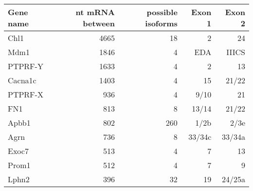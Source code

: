 \small
\begin{tabular}{|l|r|r|r|r|}

  \hline
  \textbf{Gene name} & \textbf{nt mRNA between} & \textbf{possible isoforms} & \textbf{Exon 1} & \textbf{Exon 2} \\ \hline
  Chl1               & 4665                              & 18                         & 2               & 24              \\ \hline
  Mdm1               & 1846                              & 4                          & EDA             & IIICS           \\ \hline
  PTPRF-Y            & 1633                              & 4                          & 2               & 13              \\ \hline
  Cacna1c            & 1403                              & 4                          & 15              & 21/22           \\ \hline
  PTPRF-X            & 936                               & 4                          & 9/10            & 21              \\ \hline
  FN1                & 813                               & 8                          & 13/14           & 21/22           \\ \hline
  Apbb1              & 802                               & 260                        & 1/2b            & 2/3e            \\ \hline
  Agrn               & 736                               & 8                          & 33/34c          & 33/34a          \\ \hline
  Exoc7              & 513                               & 4                          & 7               & 13              \\ \hline
  Prom1              & 512                               & 4                          & 7               & 9               \\ \hline
  Lphn2              & 396                               & 32                         & 19              & 24/25a          \\ \hline
  \end{tabular}

